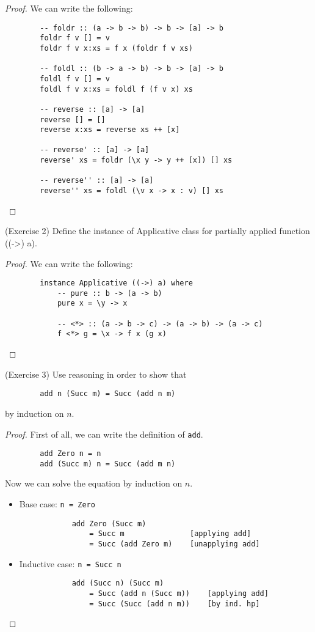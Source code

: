 \documentclass[12pt,a4paper,oneside]{book}
\begin{document}
\begin{proof}
	We can write the following:
	\begin{verbatim}
		-- foldr :: (a -> b -> b) -> b -> [a] -> b
		foldr f v [] = v
		foldr f v x:xs = f x (foldr f v xs)
		
		-- foldl :: (b -> a -> b) -> b -> [a] -> b
		foldl f v [] = v
		foldl f v x:xs = foldl f (f v x) xs
		
		-- reverse :: [a] -> [a]
		reverse [] = []
		reverse x:xs = reverse xs ++ [x]
		
		-- reverse' :: [a] -> [a]
		reverse' xs = foldr (\x y -> y ++ [x]) [] xs
		
		-- reverse'' :: [a] -> [a]
		reverse'' xs = foldl (\v x -> x : v) [] xs
	\end{verbatim}
\end{proof}

\begin{exercise}{(Exercise 2)}
	Define the instance of Applicative class for partially applied function ((->) a).
\end{exercise}

\begin{proof}
	We can write the following:
	\begin{verbatim}
		instance Applicative ((->) a) where
			-- pure :: b -> (a -> b)
			pure x = \y -> x
			
			-- <*> :: (a -> b -> c) -> (a -> b) -> (a -> c)
			f <*> g = \x -> f x (g x)
	\end{verbatim}
\end{proof}

\begin{exercise}{(Exercise 3)}
	Use reasoning in order to show that 
	\begin{verbatim}
		add n (Succ m) = Succ (add n m)
	\end{verbatim}
	by induction on $n$.
\end{exercise}

\begin{proof}
	First of all, we can write the definition of \texttt{add}.
	\begin{verbatim}
		add Zero n = n
		add (Succ m) n = Succ (add m n)
	\end{verbatim}
	Now we can solve the equation by induction on $n$.
	\begin{itemize}
		\item Base case: \texttt{n = Zero}
		\begin{verbatim}
			add Zero (Succ m)
			    = Succ m               [applying add]
			    = Succ (add Zero m)    [unapplying add]
		\end{verbatim}
		
		\item Inductive case: \texttt{n = Succ n}
		\begin{verbatim}
			add (Succ n) (Succ m)
			    = Succ (add n (Succ m))    [applying add]
			    = Succ (Succ (add n m))    [by ind. hp]
		\end{verbatim}
	\end{itemize}
\end{proof}
\end{document}
